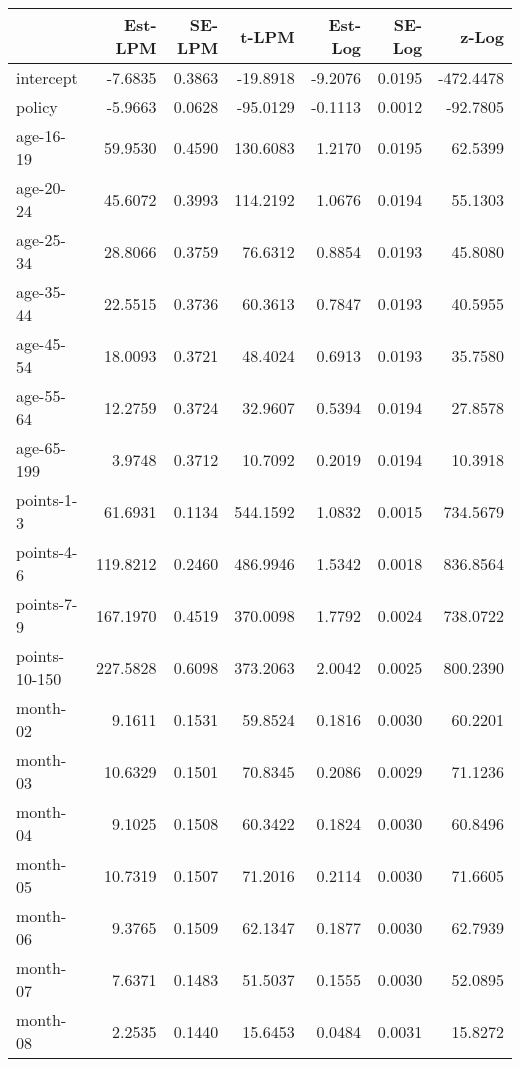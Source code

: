 \documentclass[10pt]{article}
\begin{document}

\begin{table}[ht]
\centering
\begin{tabular}{lrrrrrr}
  \hline
 & Est-LPM & SE-LPM & t-LPM & Est-Log & SE-Log & z-Log \\ 
  \hline
intercept & -7.6835 & 0.3863 & -19.8918 & -9.2076 & 0.0195 & -472.4478 \\ 
  policy & -5.9663 & 0.0628 & -95.0129 & -0.1113 & 0.0012 & -92.7805 \\ 
  age-16-19 & 59.9530 & 0.4590 & 130.6083 & 1.2170 & 0.0195 & 62.5399 \\ 
  age-20-24 & 45.6072 & 0.3993 & 114.2192 & 1.0676 & 0.0194 & 55.1303 \\ 
  age-25-34 & 28.8066 & 0.3759 & 76.6312 & 0.8854 & 0.0193 & 45.8080 \\ 
  age-35-44 & 22.5515 & 0.3736 & 60.3613 & 0.7847 & 0.0193 & 40.5955 \\ 
  age-45-54 & 18.0093 & 0.3721 & 48.4024 & 0.6913 & 0.0193 & 35.7580 \\ 
  age-55-64 & 12.2759 & 0.3724 & 32.9607 & 0.5394 & 0.0194 & 27.8578 \\ 
  age-65-199 & 3.9748 & 0.3712 & 10.7092 & 0.2019 & 0.0194 & 10.3918 \\ 
  points-1-3 & 61.6931 & 0.1134 & 544.1592 & 1.0832 & 0.0015 & 734.5679 \\ 
  points-4-6 & 119.8212 & 0.2460 & 486.9946 & 1.5342 & 0.0018 & 836.8564 \\ 
  points-7-9 & 167.1970 & 0.4519 & 370.0098 & 1.7792 & 0.0024 & 738.0722 \\ 
  points-10-150 & 227.5828 & 0.6098 & 373.2063 & 2.0042 & 0.0025 & 800.2390 \\ 
  month-02 & 9.1611 & 0.1531 & 59.8524 & 0.1816 & 0.0030 & 60.2201 \\ 
  month-03 & 10.6329 & 0.1501 & 70.8345 & 0.2086 & 0.0029 & 71.1236 \\ 
  month-04 & 9.1025 & 0.1508 & 60.3422 & 0.1824 & 0.0030 & 60.8496 \\ 
  month-05 & 10.7319 & 0.1507 & 71.2016 & 0.2114 & 0.0030 & 71.6605 \\ 
  month-06 & 9.3765 & 0.1509 & 62.1347 & 0.1877 & 0.0030 & 62.7939 \\ 
  month-07 & 7.6371 & 0.1483 & 51.5037 & 0.1555 & 0.0030 & 52.0895 \\ 
  month-08 & 2.2535 & 0.1440 & 15.6453 & 0.0484 & 0.0031 & 15.8272 \\ 

\end{tabular}
\end{table}
\end{document}
